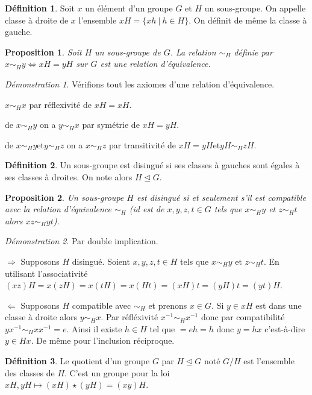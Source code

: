 \documentclass[a4paper, 11pt, french]{book}
\newenvironment{itemise}{\itemize}{\enditemize}
\theoremstyle{plain} %
\newtheorem{proposition}{Proposition}
\theoremstyle{definition} %
\newtheorem{definition}{Définition}
\theoremstyle{remark} %
\newtheorem*{demonstration}{Démonstration}
\newcommand{\1}{\mathds{1}}
\newcommand{\inv}[1]{#1^{-1}}
\newcommand{\et}{\mathrel{\mathrm{et}}}
\newcommand\ens[2]{\{#1 \ |\ #2\}}
\newcommand\equivalence[3]{
	\begin{demonstration}
		#1
		\begin{itemise}
			\item[$\Longrightarrow$] #2
			\item[$\Longleftarrow$] #3
		\end{itemise}
	\end{demonstration}
}
\begin{document}
\begin{definition}
	Soit $x$ un élément d'un groupe $G$ et $H$ un sous-groupe.
	On appelle classe à droite de $x$ l'ensemble $xH = \ens{xh}{h\in H}$.
	On définit de même la classe à gauche.
\end{definition}

\begin{proposition}
	Soit $H$ un sous-groupe de $G$.
	La relation $\sim_H$ définie par $x\sim_H y\iff xH = yH$  sur $G$ est une relation d'équivalence.
\end{proposition}

\begin{demonstration}
	Vérifions tout les axiomes d'une relation d'équivalence.
	\begin{itemise}
		\item $x\sim_H x$ par réflexivité de $xH = xH$.
		\item de $x\sim_H y$ on a $y\sim_H x$ par symétrie de $xH = yH$.
		\item de $x\sim_H y\et y\sim_H z$ on a $x\sim_H z$ par transitivité de $xH = yH\et yH\sim_H zH$.
	\end{itemise}
\end{demonstration}

\begin{definition}
	Un sous-groupe est disingué si ses classes à gauches sont égales à ses classes à droites.
	On note alors $H \trianglelefteq G$.
\end{definition}

\begin{proposition}
	Un sous-groupe $H$ est disingué si et seulement s'il est compatible avec la relation d'équivalence $\sim_H$
	(id est de $x, y, z, t\in G$ tels que $x\sim_H y$ et $z\sim_H t$ alors $xz\sim_H yt$).
\end{proposition}

\equivalence{Par double implication.}{
	Supposons $H$ disingué.
	Soient $x, y, z, t\in H$ tels que $x\sim_H y$ et $z\sim_H t$.
	En utilisant l'associativité $(xz)H = x(zH) = x(tH) = x(Ht) = (xH)t = (yH)t = (yt)H$.
}{
	Supposons $H$ compatible avec $\sim_H$ et prenons $x\in G$.
	Si $y\in xH$ est dans une classe à droite alors $y\sim_H x$.
	Par réfléxivité $\inv{x}\sim_H \inv{x}$ donc par compatibilité $y\inv{x}\sim_H x\inv{x}=e$.
	Ainsi il existe $h\in H$ tel que $ = eh = h$ donc $y=hx$ c'est-à-dire $y\in Hx$.
	De même pour l'inclusion réciproque.
}

\begin{definition}
	Le quotient d'un groupe $G$ par $H\trianglelefteq G$ noté $G/H$ est l'ensemble des classes de $H$.
	C'est un groupe pour la loi $xH, yH\longmapsto (xH)\star(yH)=(xy)H$.
\end{definition}
\end{document}
